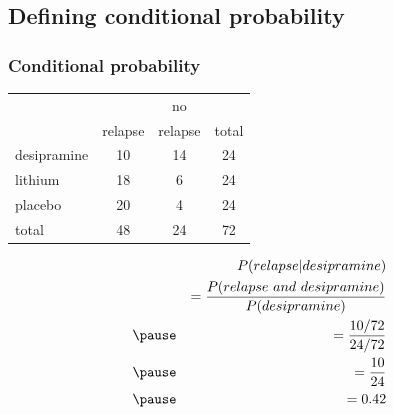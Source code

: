\documentclass[11pt,containsverbatim,handout]{beamer}
\begin{document}

\subsection{Defining conditional probability}


\begin{frame}
\frametitle{Conditional probability}


\pause

{
{\small
\begin{center}
\begin{tabular}{l | c c | c}
			& 		& no 		&  \\
			& relapse	& relapse	& total \\
\hline
desipramine	& 10		& 14		& 24 \\
lithium		& 18		& 6		& 24 \\
placebo		& 20		& 4		& 24  \\
\hline
total			& 48		& 24		&  72
\end{tabular}
\end{center}
}
}
{
\begin{eqnarray*}
&&P(relapse |  desipramine) \\
&&= \frac{P(relapse ~ and ~ desipramine)}{P(desipramine)} \\
\pause
&&= \frac{10 / 72}{24 / 72} \\
\pause
&&= \frac{10}{24} \\
\pause
&&= 0.42
\end{eqnarray*}
}

\end{frame}

\end{document}
